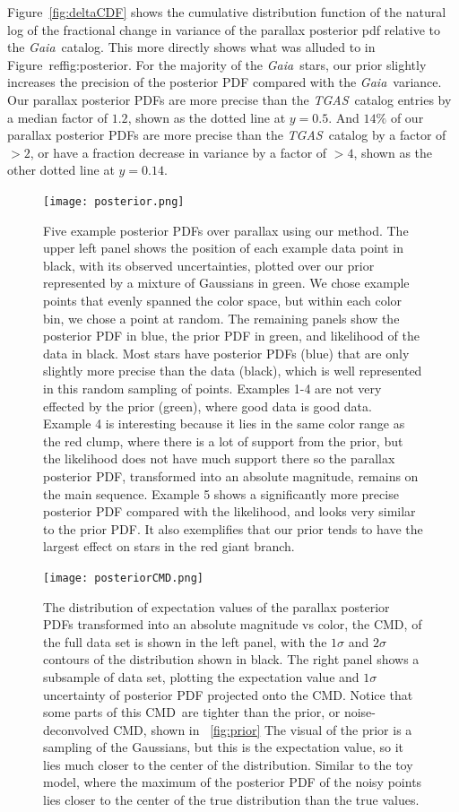 \documentclass[modern]{aastex61}
\newcommand{\acronym}[1]{{\small{#1}}}
\newcommand{\project}[1]{\textsl{#1}}
\newcommand{\tgas}{\project{\acronym{TGAS}}}
\newcommand{\gaia}{\project{Gaia}}
\newcommand{\cmd}{\acronym{CMD}}
\begin{document}
Figure~\ref{fig:deltaCDF} shows the cumulative distribution function of the natural log of the fractional change in variance of the parallax posterior pdf relative to the \gaia\ catalog. This more directly shows what was alluded to in Figure~ref{fig:posterior}. For the majority of the \gaia\ stars, our prior slightly increases the precision of the posterior PDF compared with the \gaia\ variance. Our parallax posterior PDFs are more precise than the \tgas\ catalog entries by a median factor of $1.2$, shown as the dotted line at $y=0.5$.
And $14\%$ of our parallax posterior PDFs are more precise than the \tgas\ catalog by a factor of $>2$, or have a fraction decrease in variance by a factor of $>4$, shown as the other dotted line at $y=0.14$.


\begin{figure}
\centering
  \texttt{[image: posterior.png]}
\caption{Five example posterior PDFs over parallax using our method.
The upper left panel shows the position of each example data point in black, with its observed uncertainties, plotted over our prior represented by a mixture of Gaussians in green.
We chose example points that evenly spanned the color space, but within each color bin, we chose a point at random.
The remaining panels show the posterior PDF in blue, the prior PDF in green, and likelihood of the data in black.
Most stars have posterior PDFs (blue) that are only slightly more precise than the data (black), which is well represented in this random sampling of points.
Examples 1-4 are not very effected by the prior (green), where good data is good data.
Example 4 is interesting because it lies in the same color range as the red clump, where there is a lot of support from the prior, but the likelihood does not have much support there so the parallax posterior PDF, transformed into an absolute magnitude, remains on the main sequence.
Example 5 shows a significantly more precise posterior PDF compared with the likelihood, and looks very similar to the prior PDF.
It also exemplifies that our prior tends to have the largest effect on stars in the red giant branch.}
\label{fig:posterior}
\end{figure}

\begin{figure}
\centering
  \texttt{[image: posteriorCMD.png]}
\caption{The distribution of expectation values of the parallax posterior PDFs transformed into an absolute magnitude vs color, the \cmd, of the full data set is shown in the left panel, with the $1\sigma$ and $2\sigma$ contours of the distribution shown in black.
The right panel shows a subsample of data set, plotting the expectation value and $1\sigma$ uncertainty of posterior PDF projected onto the \cmd.
Notice that some parts of this \cmd\ are tighter than the prior, or noise-deconvolved \cmd, shown in \figurename~\ref{fig:prior}
The visual of the prior is a sampling of the Gaussians, but this is the expectation
  value, so it lies much closer to the center of the
  distribution. Similar to the toy model, where the maximum of the
  posterior PDF of the noisy points lies closer to the center of the true distribution than the true values.}
\label{fig:posteriorCMD}
\end{figure}
\end{document}
